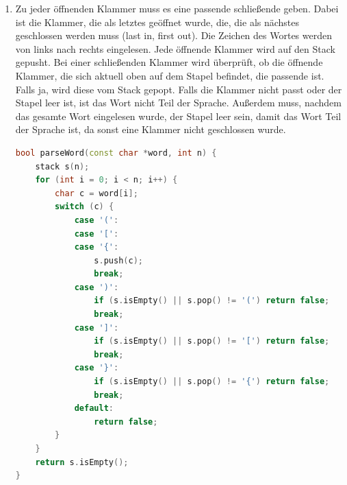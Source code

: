 \documentclass[11pt,a4paper]{article}
\begin{document}
\begin{loesung}
\begin{enumerate}
        \item 
        Zu jeder öffnenden Klammer muss es eine passende schließende geben.
        Dabei ist die Klammer, die als letztes geöffnet wurde, die, die als nächstes geschlossen werden muss (last in, first out).
        Die Zeichen des Wortes werden von links nach rechts eingelesen.
        Jede öffnende Klammer wird auf den Stack gepusht.
        Bei einer schließenden Klammer wird überprüft, ob die öffnende Klammer, die sich aktuell oben auf dem Stapel befindet, die passende ist.
        Falls ja, wird diese vom Stack gepopt.
        Falls die Klammer nicht passt oder der Stapel leer ist, ist das Wort nicht Teil der Sprache.
        Außerdem muss, nachdem das gesamte Wort eingelesen wurde, der Stapel leer sein, damit das Wort Teil der Sprache ist, da sonst eine Klammer nicht geschlossen wurde.
        \begin{lstlisting}[language=c++]
bool parseWord(const char *word, int n) {
    stack s(n);
    for (int i = 0; i < n; i++) {
        char c = word[i];
        switch (c) {
            case '(':
            case '[':
            case '{':
                s.push(c);
                break;
            case ')':
                if (s.isEmpty() || s.pop() != '(') return false;
                break;
            case ']':
                if (s.isEmpty() || s.pop() != '[') return false;
                break;
            case '}':
                if (s.isEmpty() || s.pop() != '{') return false;
                break;
            default:
                return false;
        }
    }
    return s.isEmpty();
}
        \end{lstlisting}


\end{enumerate}
\end{loesung}
\end{document}
